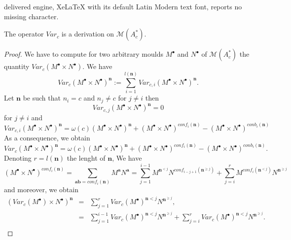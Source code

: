 \documentclass[10pt,a4paper]{amsart}
\def\M{\mathscr{M}}
\def\aa{\mathbf{a}}
\def\bb{\mathbf{b}}
\def\di{\displaystyle}
\def\nn{\mathbf{n}}
\begin{document}
delivered engine, XeLaTeX with its default Latin Modern text font, reports no missing character.
\begin{theorem}
    The operator $Var_c$ is a derivation on $\M (A_c^* )$.
\end{theorem}

\begin{proof}
    We have to compute for two arbitrary moulds $M^{\bullet}$ and $N^{\bullet}$ of $\M (A_c^* )$ the quantity $Var_c (M^{\bullet} \times N^{\bullet} )$. We have 
    \begin{equation}
        Var_c (M^{\bullet} \times N^{\bullet})^{\nn} :=\di\sum_{i=1}^{l(\nn )} Var_{c,i} (M^{\bullet} \times N^{\bullet})^{\nn} .
    \end{equation}
Let $\nn$ be such that $n_i =c$ and $n_j\not =c$ for $j\not= i$ then
    \begin{equation}
        Var_{c,j} (M^{\bullet} \times N^{\bullet})^{\nn} =0 
    \end{equation}
    for $j\not=i$ and
    \begin{equation}
        Var_{c,i} (M^{\bullet} \times N^{\bullet})^{\nn} =\omega (c) (M^{\bullet} \times N^{\bullet} )^{\nn} + (M^{\bullet} \times N^{\bullet} )^{conf_i (\nn )} -(M^{\bullet} \times N^{\bullet} )^{conb_i (\nn )}
    \end{equation}
    As a consequence, we obtain
    \begin{equation}
    \label{var0}
        Var_c (M^{\bullet} \times N^{\bullet})^{\nn} =\omega (c) (M^{\bullet} \times N^{\bullet} )^{\nn} + (M^{\bullet} \times N^{\bullet} )^{conf_i (\nn )} -(M^{\bullet} \times N^{\bullet} )^{conb_i (\nn )} .
    \end{equation}
Denoting $r=l (\nn )$ the lenght of $\nn$, We have    
\begin{equation}
    (M^{\bullet} \times N^{\bullet} )^{conf_i (\nn )} =\di\sum_{\aa \bb = conf_i (\nn ) } M^{\aa} N^{\aa} =\sum_{j=1}^{i-1} M^{\nn^{<j}} N^{conf_{i-j+1} (\nn^{\geq j} )} +
    \sum_{j=i}^{r} M^{conf_i (\nn^{<j})} N^{\nn^{\geq j}}
\end{equation}
and moreover, we obtain 
\begin{equation}
\left .
\begin{array}{lll}
\left (     Var_c (M^{\bullet})\times N^{\bullet} \right ) ^{\nn} & = & 
\di\sum_{j=1}^r \di Var_c (M^{\bullet})^{\nn <j} N^{\nn^{\geq j}} ,\\
 & = & \di\sum_{j=1}^{i-1} Var_c (M^{\bullet})^{\nn <j} N^{\nn^{\geq j}} 
 + \di\sum_{j=i}^{r} Var_c (M^{\bullet})^{\nn <j} N^{\nn^{\geq j}} .\\

\end{array}
\end{equation}
\end{proof}
\end{document}
